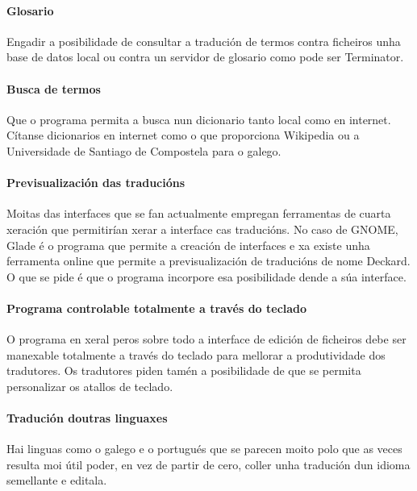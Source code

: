 	\paragraph{Glosario} Engadir a posibilidade de consultar a tradución de termos contra ficheiros unha base de datos local ou contra un servidor de glosario como pode ser Terminator.

	\paragraph{Busca de termos} Que o programa permita a busca nun dicionario tanto local como en internet. Cítanse dicionarios en internet como o que proporciona Wikipedia ou a Universidade de Santiago de Compostela para o galego.

	\paragraph{Previsualización das traducións} Moitas das interfaces que se fan actualmente empregan ferramentas de cuarta xeración que permitirían xerar a interface cas traducións. No caso de GNOME, Glade é o programa que permite a creación de interfaces e xa existe unha ferramenta online que permite a previsualización de traducións de nome Deckard. O que se pide é que o programa incorpore esa posibilidade dende a súa interface.

	\paragraph{Programa controlable totalmente a través do teclado} O programa en xeral peros sobre todo a interface de edición de ficheiros debe ser manexable totalmente a través do teclado para mellorar a produtividade dos tradutores. Os tradutores piden tamén a posibilidade de que se permita personalizar os atallos de teclado.

	\paragraph{Tradución doutras linguaxes} Hai linguas como o galego e o portugués que se parecen moito polo que as veces resulta moi útil poder, en vez de partir de cero, coller unha tradución dun idioma semellante e editala.

